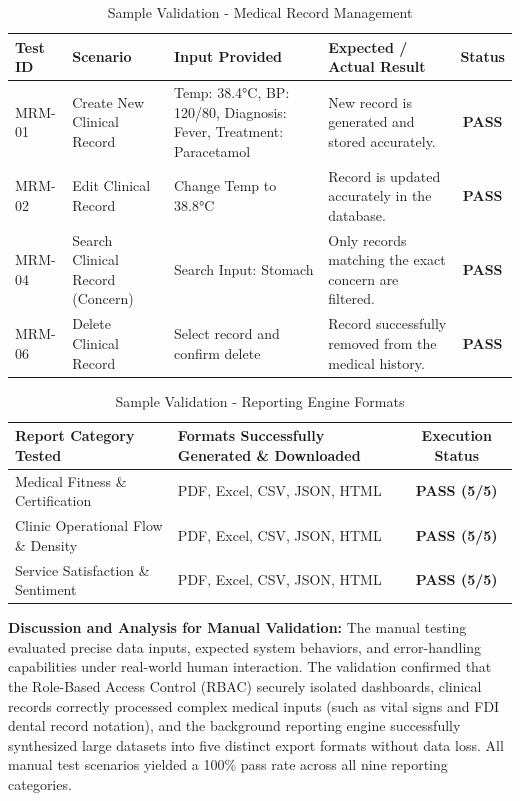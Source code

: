 \begin{table}[htbp]
\centering
\caption{Sample Validation - Medical Record Management}
\label{tab:sample_mrm}
\begin{tabularx}{\textwidth}{|l|Y|Y|Y|c|}
\hline
\textbf{Test ID} & \textbf{Scenario} & \textbf{Input Provided} & \textbf{Expected / Actual Result} & \textbf{Status} \\
\hline
MRM-01 & Create New Clinical Record & Temp: 38.4°C, BP: 120/80, Diagnosis: Fever, Treatment: Paracetamol & New record is generated and stored accurately. & \textbf{PASS} \\
\hline
MRM-02 & Edit Clinical Record & Change Temp to 38.8°C & Record is updated accurately in the database. & \textbf{PASS} \\
\hline
MRM-04 & Search Clinical Record (Concern) & Search Input: Stomach & Only records matching the exact concern are filtered. & \textbf{PASS} \\
\hline
MRM-06 & Delete Clinical Record & Select record and confirm delete & Record successfully removed from the medical history. & \textbf{PASS} \\
\hline
\end{tabularx}
\end{table}

\begin{table}[htbp]
\centering
\caption{Sample Validation - Reporting Engine Formats}
\label{tab:sample_reports}
\begin{tabularx}{\textwidth}{|Y|Y|c|}
\hline
\textbf{Report Category Tested} & \textbf{Formats Successfully Generated \& Downloaded} & \textbf{Execution Status} \\
\hline
Medical Fitness \& Certification & PDF, Excel, CSV, JSON, HTML & \textbf{PASS (5/5)} \\
\hline
Clinic Operational Flow \& Density & PDF, Excel, CSV, JSON, HTML & \textbf{PASS (5/5)} \\
\hline
Service Satisfaction \& Sentiment & PDF, Excel, CSV, JSON, HTML & \textbf{PASS (5/5)} \\
\hline
\end{tabularx}
\end{table}

\textbf{Discussion and Analysis for Manual Validation:} The manual testing evaluated precise data inputs, expected system behaviors, and error-handling capabilities under real-world human interaction. The validation confirmed that the Role-Based Access Control (RBAC) securely isolated dashboards, clinical records correctly processed complex medical inputs (such as vital signs and FDI dental record notation), and the background reporting engine successfully synthesized large datasets into five distinct export formats without data loss. All manual test scenarios yielded a 100\% pass rate across all nine reporting categories.

